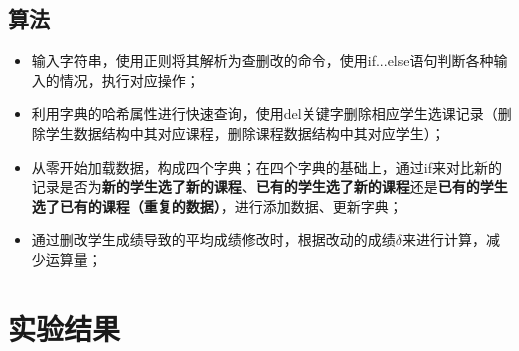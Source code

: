 \documentclass[UTF8]{ctexart}
\begin{document}
    \subsection{算法}
    \begin{itemize}
        \item 输入字符串，使用正则将其解析为查删改的命令，使用if...else语句判断各种输入的情况，执行对应操作；
        \item 利用字典的哈希属性进行快速查询，使用del关键字删除相应学生选课记录（删除学生数据结构中其对应课程，删除课程数据结构中其对应学生）；
        \item 从零开始加载数据，构成四个字典；在四个字典的基础上，通过if来对比新的记录是否为\textbf{新的学生选了新的课程}、\textbf{已有的学生选了新的课程}还是\textbf{已有的学生选了已有的课程（重复的数据）}，进行添加数据、更新字典；
        \item 通过删改学生成绩导致的平均成绩修改时，根据改动的成绩$\delta$来进行计算，减少运算量；
    \end{itemize}
    \section{实验结果}
\end{document}
